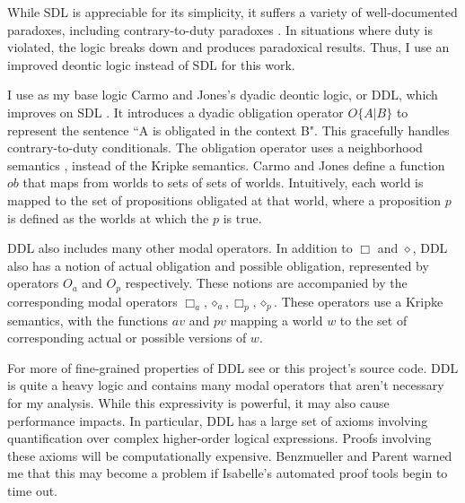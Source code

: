 \begin{isabellebody}
\begin{isamarkuptext}
 While SDL is appreciable for its simplicity, it suffers a variety of well-documented paradoxes, 
including contrary-to-duty paradoxes \cite{ctd}. In situations where duty is violated, the logic breaks down 
and produces paradoxical results. Thus, I use an improved deontic logic instead of SDL for this work.%
\end{isamarkuptext}\isamarkuptrue%
%
\isadelimdocument
%
\endisadelimdocument
%
\isatagdocument
%
\isamarkuptrue%
%
\endisatagdocument
{\isafolddocument}%
%
\isadelimdocument
%
\endisadelimdocument
%
\begin{isamarkuptext}%
I use as my base logic Carmo and Jones's dyadic deontic logic, or DDL, which improves on SDL \cite{CJDDL}. 
It introduces a dyadic obligation operator $O\{A \vert B\}$ 
to represent the sentence ``A is obligated in the context B". This gracefully handles contrary-to-duty
conditionals. The obligation operator uses a neighborhood semantics \cite{neighborhood1}\cite{neighborhood2}, instead of the Kripke semantics. 
Carmo and Jones define a function $ob$ that maps from worlds to sets of sets of worlds. Intuitively, 
each world is mapped to the set of propositions obligated at that world, where a proposition $p$ is defined as 
the worlds at which the $p$ is true.

DDL also includes many other modal operators. In addition to $\Box$ and $\diamond$, DDL also has a notion
of actual obligation and possible obligation, represented by operators $O_a$ and $O_p$ respectively. 
These notions are accompanied by the corresponding modal operators $\Box_a, \diamond_a, \Box_p, \diamond_p$. 
These operators use a Kripke semantics, with the functions $av$ and $pv$ mapping a world $w$ to the set 
of corresponding actual or possible versions of $w$. 

For more of fine-grained properties of DDL see \cite{CJDDL} or this project's source code. DDL is quite a heavy logic and contains many modal operators 
that aren't necessary for my analysis. While this expressivity is powerful, it may also cause performance
impacts. In particular, DDL has a large set of axioms involving quantification over complex higher-order
logical expressions. Proofs involving these axioms will be computationally expensive.  Benzmueller 
and Parent warned me that this may become a problem if Isabelle's automated proof tools begin to time out.%
\end{isamarkuptext}\isamarkuptrue%
%
\isadelimdocument
%
\endisadelimdocument
%
\isatagdocument
%
\endisatagdocument
{\isafolddocument}%
%
\isadelimdocument
%
\endisadelimdocument
%
\isadelimtheory
%
\endisadelimtheory
%
\isatagtheory
%
\endisatagtheory
{\isafoldtheory}%
%
\isadelimtheory
%
\endisadelimtheory
%
\end{isabellebody}%
